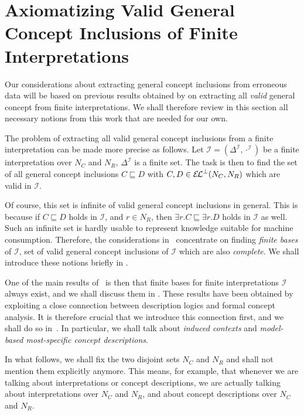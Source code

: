 \chapter{Axiomatizing Valid General Concept Inclusions of Finite
  Interpretations}
\label{cha:axiom-valid-el}

Our considerations about extracting general concept inclusions from erroneous data will be
based on previous results obtained by \textcite{Diss-Felix} on extracting all \emph{valid}
general concept from finite interpretations.  We shall therefore review in this section
all necessary notions from this work that are needed for our own.

The problem of extracting all valid general concept inclusions from a finite
interpretation can be made more precise as follows.  Let $\mathcal{I} =
(\Delta^{\mathcal{I}}, \cdot^{\mathcal{I}})$ be a finite interpretation over $N_C$ and
$N_R$, \ie $\Delta^{\mathcal{I}}$ is a finite set.  The task is then to find the set of
all general concept inclusions $C \sqsubseteq D$ with $C, D \in {\ensuremath{{\mathcal{E}\kern-.3ex\mathcal{L}}^\bot}}(N_C, N_R)$ which
are valid in $\mathcal{I}$.

Of course, this set is infinite of valid general concept inclusions in general.  This is
because if $C \sqsubseteq D$ holds in $\mathcal{I}$, and $r \in N_R$, then $\exists r. C
\sqsubseteq \exists r. D$ holds in $\mathcal{I}$ as well.  Such an infinite set is hardly
usable to represent knowledge suitable for machine consumption.  Therefore, the
considerations in~\cite{Diss-Felix} concentrate on finding \emph{finite bases} of
$\mathcal{I}$, \ie set of valid general concept inclusions of $\mathcal{I}$ which are also
\emph{complete}.  We shall introduce these notions briefly in .

One of the main results of~\cite{Diss-Felix} is then that finite bases for finite
interpretations $\mathcal{I}$ always exist, and we shall discuss them in
.  These results have been obtained by exploiting a close
connection between description logics and formal concept analysis.  It is therefore
crucial that we introduce this connection first, and we shall do so
in~.  In particular, we shall talk about \emph{induced contexts} and
\emph{model-based most-specific concept descriptions}.

In what follows, we shall fix the two disjoint sets $N_C$ and $N_R$ and shall not mention
them explicitly anymore.  This means, for example, that whenever we are talking about
interpretations or concept descriptions, we are actually talking about interpretations
over $N_C$ and $N_R$, and about concept descriptions over $N_C$ and $N_R$.

